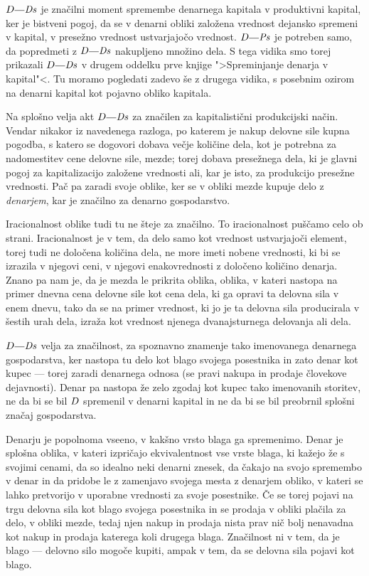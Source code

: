 \documentclass[kapital_02.tex]{subfiles}
\begin{document}
\(\KPED\KPEcrta\KPEDs\) je značilni moment spremembe denarnega kapitala v produktivni kapital, ker je bistveni pogoj, da se v denarni obliki založena vrednost dejansko spremeni v kapital, v presežno vrednost ustvarjajočo vrednost. \(\KPED\KPEcrta\KPEPs\) je potreben samo, da popredmeti z \(\KPED\KPEcrta\KPEDs\) nakupljeno množino dela. S tega vidika smo torej prikazali \(\KPED\KPEcrta\KPEDs\) v drugem oddelku prve knjige ">Spreminjanje denarja v kapital"<. Tu moramo pogledati zadevo še z drugega vidika, s posebnim ozirom na denarni kapital kot pojavno obliko kapitala.

Na splošno velja akt \(\KPED\KPEcrta\KPEDs\) za značilen za kapitalistični produkcijski način. Vendar nikakor iz navedenega razloga, po katerem je nakup delovne sile kupna pogodba, s katero se dogovori dobava večje količine dela, kot je potrebna za nadomestitev cene delovne sile, mezde; torej dobava presežnega dela, ki je glavni pogoj za kapitalizacijo založene vrednosti ali, kar je isto, za produkcijo presežne vrednosti. Pač pa zaradi svoje oblike, ker se v obliki mezde kupuje delo z \emph{denarjem}, kar je značilno za denarno gospodarstvo.

Iracionalnost oblike tudi tu ne šteje za značilno. To iracionalnost puščamo celo ob strani. Iracionalnost je v tem, da delo samo kot vrednost ustvarjajoči element, torej tudi ne določena količina dela, ne more imeti nobene vrednosti, ki bi se izrazila v njegovi ceni, v njegovi enakovrednosti z določeno količino denarja. Znano pa nam je, da je mezda le prikrita oblika, oblika, v kateri nastopa na primer dnevna cena delovne sile kot cena dela, ki ga opravi ta delovna sila v enem dnevu, tako da se na primer vrednost, ki jo je ta delovna sila producirala v šestih urah dela, izraža kot vrednost njenega dvanajsturnega delovanja ali dela.

\(\KPED\KPEcrta\KPEDs\) velja za značilnost, za spoznavno znamenje tako imenovanega denarnega gospodarstva, ker nastopa tu delo kot blago svojega posestnika in zato denar kot kupec --- torej zaradi denarnega odnosa (se pravi nakupa in prodaje človekove dejavnosti). Denar pa nastopa že zelo zgodaj kot kupec tako imenovanih storitev, ne da bi se bil \(D\) spremenil v denarni kapital in ne da bi se bil preobrnil splošni značaj gospodarstva.

Denarju je popolnoma vseeno, v kakšno vrsto blaga ga spremenimo. Denar je splošna oblika, v kateri izpričajo ekvivalentnost vse vrste blaga, ki kažejo že s svojimi cenami, da so idealno neki denarni znesek, da čakajo na svojo spremembo v denar in da pridobe le z zamenjavo svojega mesta z denarjem obliko, v kateri se lahko pretvorijo v uporabne vrednosti za svoje posestnike. Če se torej pojavi na trgu delovna sila kot blago svojega posestnika in se prodaja v obliki plačila za delo, v obliki mezde, tedaj njen nakup in prodaja nista prav nič bolj nenavadna kot nakup in prodaja katerega koli drugega blaga. Značilnost ni v tem, da je blago --- delovno silo mogoče kupiti, ampak v tem, da se delovna sila pojavi kot blago.
\end{document}
